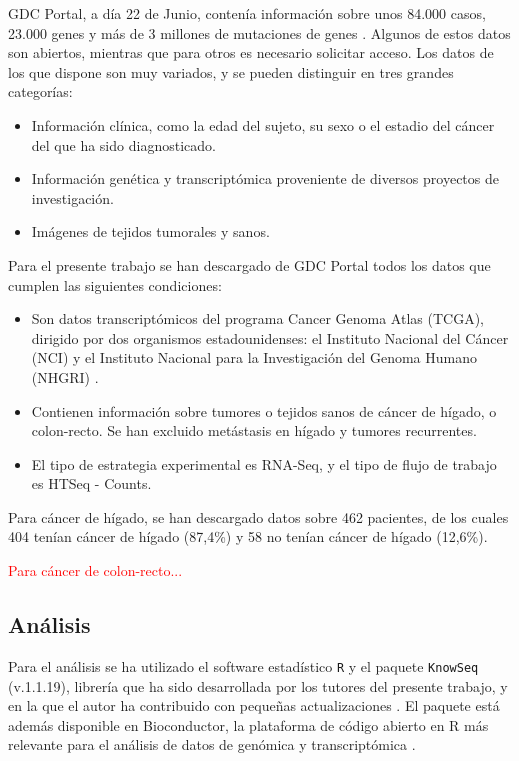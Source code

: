 GDC Portal, a día 22 de Junio, contenía información sobre unos 84.000 casos, 23.000 genes y más de 3 millones de mutaciones de genes \cite{GDCPortal}. Algunos de estos datos son abiertos, mientras que para otros es necesario solicitar acceso. Los datos de los que dispone son muy variados, y se pueden distinguir en tres grandes categorías:

\begin{itemize}
	\item Información clínica, como la edad del sujeto, su sexo o el estadio del cáncer del que ha sido diagnosticado.
	\item Información genética y transcriptómica proveniente de diversos proyectos de investigación.
	\item Imágenes de tejidos tumorales y sanos.
\end{itemize} 

Para el presente trabajo se han descargado de GDC Portal todos los datos que cumplen las siguientes condiciones:

\begin{itemize}
	\item Son datos transcriptómicos del programa Cancer Genoma Atlas (TCGA), dirigido por dos organismos estadounidenses: el Instituto Nacional del Cáncer (NCI) y el Instituto Nacional para la Investigación del Genoma Humano (NHGRI) \cite{NationalCancerInstitutea}. 
	\item Contienen información sobre tumores o tejidos sanos de cáncer de hígado, o colon-recto. Se han excluido metástasis en hígado y tumores recurrentes.
	\item El tipo de estrategia experimental es RNA-Seq, y el tipo de flujo de trabajo es HTSeq - Counts.
\end{itemize}

Para cáncer de hígado, se han descargado datos sobre 462 pacientes, de los cuales 404 tenían cáncer de hígado (87,4\%) y 58 no tenían cáncer de hígado (12,6\%).

\textcolor{red}{Para cáncer de colon-recto...}

\subsection{Análisis}

Para el análisis se ha utilizado el software estadístico \texttt{R} \cite{R} y el paquete \texttt{KnowSeq} (v.1.1.19), librería que ha sido desarrollada por los tutores del presente trabajo, y en la que el autor ha contribuido con pequeñas actualizaciones \cite{KnowSeq}. El paquete está además disponible en Bioconductor, la plataforma de código abierto en R más relevante para el análisis de datos de genómica y transcriptómica \cite{Gentleman2004}.\\

